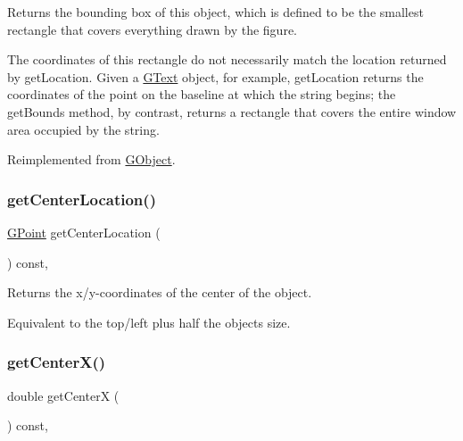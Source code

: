 Returns the bounding box of this object, which is defined to be the smallest rectangle that covers everything drawn by the figure. 

The coordinates of this rectangle do not necessarily match the location returned by {\ttfamily get\+Location}. Given a {\ttfamily \mbox{\hyperlink{classGText}{G\+Text}}} object, for example, {\ttfamily get\+Location} returns the coordinates of the point on the baseline at which the string begins; the {\ttfamily get\+Bounds} method, by contrast, returns a rectangle that covers the entire window area occupied by the string. 

Reimplemented from \mbox{\hyperlink{classGObject_a29e6ac35a0b48f491a4c88194cc5da3b}{G\+Object}}.

\mbox{\label{classGObject_a0909472e91448470bccdb62ecfb95d8b}} 
\subsubsection{\texorpdfstring{get\+Center\+Location()}{getCenterLocation()}}
{\footnotesize\ttfamily \mbox{\hyperlink{classGPoint}{G\+Point}} get\+Center\+Location (\begin{DoxyParamCaption}{ }\end{DoxyParamCaption}) const\hspace{0.3cm}{\ttfamily [virtual]}, {\ttfamily [inherited]}}



Returns the x/y-\/coordinates of the center of the object. 

Equivalent to the top/left plus half the object\textquotesingle{}s size. \mbox{\label{classGObject_a04df74355b545e0543112d5b8d924176}} 
\subsubsection{\texorpdfstring{get\+Center\+X()}{getCenterX()}}
{\footnotesize\ttfamily double get\+CenterX (\begin{DoxyParamCaption}{ }\end{DoxyParamCaption}) const\hspace{0.3cm}{\ttfamily [virtual]}, {\ttfamily [inherited]}}



